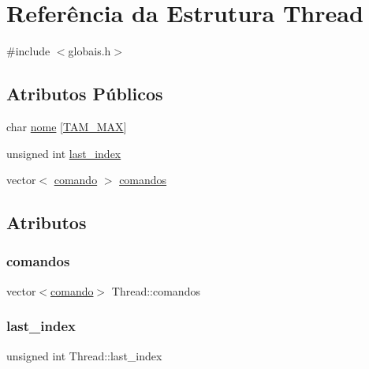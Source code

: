 \hypertarget{struct_thread}{}\section{Referência da Estrutura Thread}
\label{struct_thread}


{\ttfamily \#include $<$globais.\+h$>$}

\subsection*{Atributos Públicos}
\begin{DoxyCompactItemize}
\item 
char \hyperlink{struct_thread_a6f2b83a36d4f1c604dc4c55181561f21}{nome} \mbox{[}\hyperlink{globais_8h_ac0cf2902c27019004022f788b44d0f5e}{T\+A\+M\+\_\+\+M\+AX}\mbox{]}
\item 
unsigned int \hyperlink{struct_thread_a410269113f9c32d0239d364859dbd420}{last\+\_\+index}
\item 
vector$<$ \hyperlink{globais_8h_a64e5f15415f41c3c1fcc9dad6a3d1ed5}{comando} $>$ \hyperlink{struct_thread_aeb1148fd2123a49a7e6ff0467ce2e6d2}{comandos}
\end{DoxyCompactItemize}


\subsection{Atributos}
\mbox{\label{struct_thread_aeb1148fd2123a49a7e6ff0467ce2e6d2}} 
\subsubsection{\texorpdfstring{comandos}{comandos}}
{\footnotesize\ttfamily vector$<$\hyperlink{globais_8h_a64e5f15415f41c3c1fcc9dad6a3d1ed5}{comando}$>$ Thread\+::comandos}

\mbox{\label{struct_thread_a410269113f9c32d0239d364859dbd420}} 
\subsubsection{\texorpdfstring{last\+\_\+index}{last\_index}}
{\footnotesize\ttfamily unsigned int Thread\+::last\+\_\+index}

